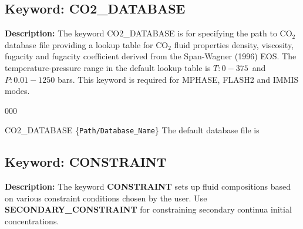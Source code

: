 
\newpage
\protect\hypertarget{target_co2dat}{}


\subsection{Keyword: CO2\_DATABASE}

\hfill\hyperlink{target_key}{\return}

\noindent
{\bf Description:}
The keyword CO2\_DATABASE is for specifying the path to CO$_2$ database file providing a lookup table for CO$_2$ fluid properties density, viscosity, fugacity and fugacity coefficient derived from the Span-Wagner (1996) EOS. The temperature-pressure range in the default lookup table is $T: 0-375$\degc\ and $P: 0.01-1250$ bars. This keyword is required for MPHASE, FLASH2 and IMMIS modes. 

\begin{deflist}{000}
\item [CO2\_DATABASE] \{{\tt Path/Database\_Name}\} \normalsize The default database file is 
\end{deflist}

\hyperlink{target_key}{\return}



\newpage
\protect\hypertarget{target_constraint}{}

\subsection{Keyword: CONSTRAINT}

\hfill\hyperlink{target_key}{\return}

\noindent
{\bf Description:}
The keyword {\bf CONSTRAINT} sets up fluid compositions based on various constraint conditions chosen by the user. Use {\bf SECONDARY\_CONSTRAINT} for constraining secondary continua initial concentrations.

